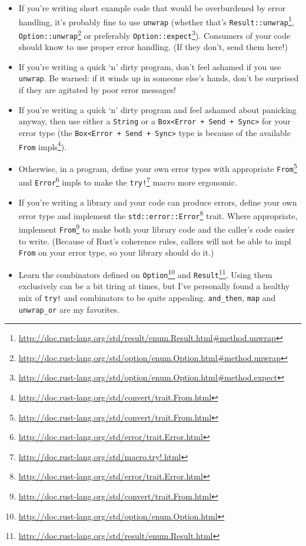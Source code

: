 \documentclass[a4paper,]{book}
\renewcommand{\href}[2]{#2\footnote{\url{#1}}}
\begin{document}
\begin{itemize}
\itemsep1pt\parskip0pt
\item
  If you're writing short example code that would be overburdened by
  error handling, it's probably fine to use \texttt{unwrap} (whether
  that's
  \href{http://doc.rust-lang.org/std/result/enum.Result.html\#method.unwrap}{\texttt{Result::unwrap}},
  \href{http://doc.rust-lang.org/std/option/enum.Option.html\#method.unwrap}{\texttt{Option::unwrap}}
  or preferably
  \href{http://doc.rust-lang.org/std/option/enum.Option.html\#method.expect}{\texttt{Option::expect}}).
  Consumers of your code should know to use proper error handling. (If
  they don't, send them here!)
\item
  If you're writing a quick `n' dirty program, don't feel ashamed if you
  use \texttt{unwrap}. Be warned: if it winds up in someone else's
  hands, don't be surprised if they are agitated by poor error messages!
\item
  If you're writing a quick `n' dirty program and feel ashamed about
  panicking anyway, then use either a \texttt{String} or a
  \texttt{Box\textless{}Error\ +\ Send\ +\ Sync\textgreater{}} for your
  error type (the
  \texttt{Box\textless{}Error\ +\ Send\ +\ Sync\textgreater{}} type is
  because of the
  \href{http://doc.rust-lang.org/std/convert/trait.From.html}{available
  \texttt{From} impls}).
\item
  Otherwise, in a program, define your own error types with appropriate
  \href{http://doc.rust-lang.org/std/convert/trait.From.html}{\texttt{From}}
  and
  \href{http://doc.rust-lang.org/std/error/trait.Error.html}{\texttt{Error}}
  impls to make the
  \href{http://doc.rust-lang.org/std/macro.try!.html}{\texttt{try!}}
  macro more ergonomic.
\item
  If you're writing a library and your code can produce errors, define
  your own error type and implement the
  \href{http://doc.rust-lang.org/std/error/trait.Error.html}{\texttt{std::error::Error}}
  trait. Where appropriate, implement
  \href{http://doc.rust-lang.org/std/convert/trait.From.html}{\texttt{From}}
  to make both your library code and the caller's code easier to write.
  (Because of Rust's coherence rules, callers will not be able to impl
  \texttt{From} on your error type, so your library should do it.)
\item
  Learn the combinators defined on
  \href{http://doc.rust-lang.org/std/option/enum.Option.html}{\texttt{Option}}
  and
  \href{http://doc.rust-lang.org/std/result/enum.Result.html}{\texttt{Result}}.
  Using them exclusively can be a bit tiring at times, but I've
  personally found a healthy mix of \texttt{try!} and combinators to be
  quite appealing. \texttt{and\_then}, \texttt{map} and
  \texttt{unwrap\_or} are my favorites.
\end{itemize}
\end{document}
